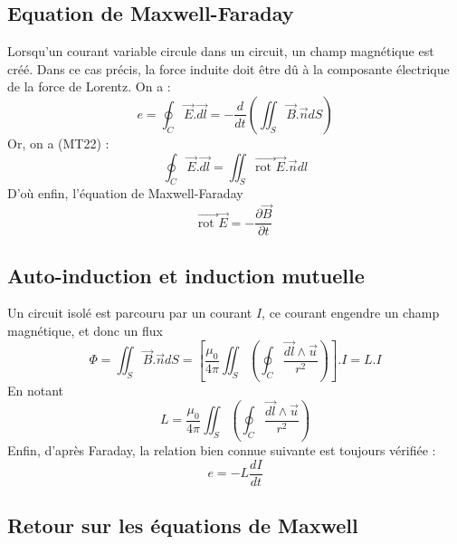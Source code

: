 \subsection{Equation de Maxwell-Faraday}
Lorsqu'un courant variable circule dans un circuit, un champ magnétique est créé. Dans ce cas précis, la force induite doit être dû à la composante électrique de la force de Lorentz. On a :
\[ e=\oint_C\vec{E}.\vec{dl}=-\frac{d}{dt}\left(\iint_S\vec{B}.\vec{n}dS\right) \]
Or, on a (MT22) :
\[ \oint_C\vec{E}.\vec{dl}=\iint_S\vec{\textrm{rot }}\vec{E}.\vec{n}dl \]
D'où enfin, l'équation  de Maxwell-Faraday
\[ \vec{\textrm{rot }}\vec{E}=-\frac{\partial\vec{B}}{\partial t} \]

\subsection{Auto-induction et induction mutuelle}

Un circuit isolé est parcouru par un courant $I$, ce courant engendre un champ magnétique, et donc un flux
\[ \Phi=\iint_S\vec{B}.\vec{n}dS=\left[\frac{\mu_0}{4\pi}\iint_S\left(\oint_C\frac{\vec{dl}\land\vec{u}}{r^2}\right)\right].I=L.I \]
En notant
\[ L= \frac{\mu_0}{4\pi}\iint_S\left(\oint_C\frac{\vec{dl}\land\vec{u}}{r^2}\right) \]
Enfin, d'après Faraday, la relation bien connue suivante est toujours vérifiée :
\[ e=-L\frac{dI}{dt} \]

\subsection{Retour sur les équations de Maxwell}


